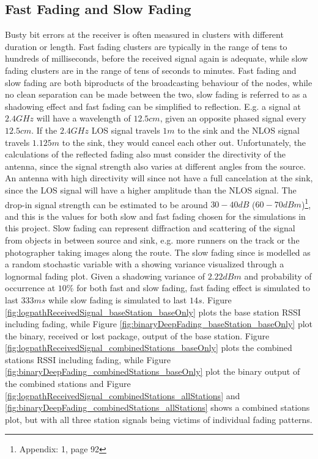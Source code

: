 \subsection{Fast Fading and Slow Fading}%
Busty bit errors at the receiver is often measured in clusters with different duration or length. Fast fading clusters are typically in the range of tens to hundreds of milliseconds, before the received signal again is adequate, while slow fading clusters are in the range of tens of seconds to minutes. Fast fading and slow fading are both biproducts of the broadcasting behaviour of the nodes, while no clean separation can be made between the two, slow fading is referred to as a shadowing effect and fast fading can be simplified to reflection. E.g. a signal at $2.4GHz$ will have a wavelength of $12.5cm$, given an opposite phased signal every $12.5cm$. If the $2.4GHz$ LOS signal travels $1m$ to the sink and the NLOS signal travels $1.125m$ to the sink, they would cancel each other out. Unfortunately, the calculations of the reflected fading also must consider the directivity of the antenna, since the signal strength also varies at different angles from the source. An antenna with high directivity will since not have a full cancelation at the sink, since the LOS signal will have a higher amplitude than the NLOS signal. The drop-in signal strength can be estimated to be around $30-40dB$ ($60-70dBm$)\footnote{Appendix: 1, page 92}, and this is the values for both slow and fast fading chosen for the simulations in this project. Slow fading can represent diffraction and scattering of the signal from objects in between source and sink, e.g. more runners on the track or the photographer taking images along the route. The slow fading since is modelled as a random stochastic variable with a showing variance visualized through a lognormal fading plot. Given a shadowing variance of $2.22dBm$ and probability of occurrence at $10\%$ for both fast and slow fading, fast fading effect is simulated to last $333 ms$ while slow fading is simulated to last $14s$. Figure \ref{fig:logpathReceivedSignal_baseStation_baseOnly} plots the base station RSSI including fading, while Figure \ref{fig:binaryDeepFading_baseStation_baseOnly} plot the binary, received or lost package, output of the base station. Figure \ref{fig:logpathReceivedSignal_combinedStations_baseOnly} plots the combined stations RSSI including fading, while Figure \ref{fig:binaryDeepFading_combinedStations_baseOnly} plot the binary output of the combined stations and Figure \ref{fig:logpathReceivedSignal_combinedStations_allStations} and \ref{fig:binaryDeepFading_combinedStations_allStations} shows a combined stations plot, but with all three station signals being victims of individual fading patterns. 

